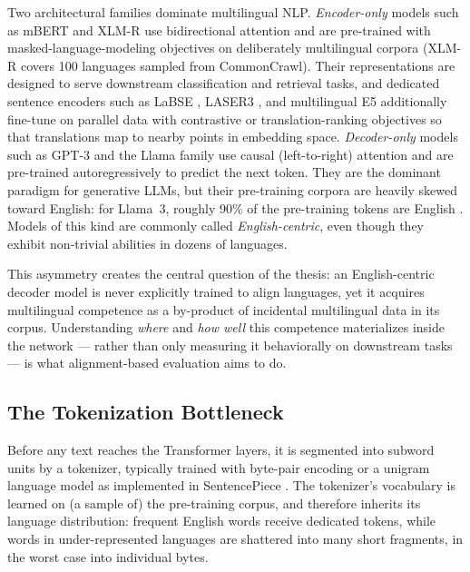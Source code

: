 Two architectural families dominate multilingual NLP. \emph{Encoder-only}
models such as mBERT \citep{devlin2019bert} and XLM-R
\citep{conneau2020xlmr} use bidirectional attention and are pre-trained
with masked-language-modeling objectives on deliberately multilingual
corpora (XLM-R covers 100 languages sampled from CommonCrawl). Their
representations are designed to serve downstream classification and
retrieval tasks, and dedicated sentence encoders such as LaBSE
\citep{feng2022labse}, LASER3 \citep{heffernan2022laser3}, and multilingual
E5 \citep{wang2024multilingual} additionally fine-tune on parallel data
with contrastive or translation-ranking objectives so that translations map
to nearby points in embedding space. \emph{Decoder-only} models such as
GPT-3 \citep{brown2020gpt3} and the Llama family \citep{dubey2024llama3}
use causal (left-to-right) attention and are pre-trained autoregressively
to predict the next token. They are the dominant paradigm for generative
LLMs, but their pre-training corpora are heavily skewed toward English:
for Llama~3, roughly 90\% of the pre-training tokens are English
\citep{dubey2024llama3}. Models of this kind are commonly called
\emph{English-centric}, even though they exhibit non-trivial abilities in
dozens of languages.

This asymmetry creates the central question of the thesis: an
English-centric decoder model is never explicitly trained to align
languages, yet it acquires multilingual competence as a by-product of
incidental multilingual data in its corpus. Understanding \emph{where} and
\emph{how well} this competence materializes inside the network --- rather
than only measuring it behaviorally on downstream tasks --- is what
alignment-based evaluation aims to do.

\subsection{The Tokenization Bottleneck}
\label{subsec:tokenization}

Before any text reaches the Transformer layers, it is segmented into
subword units by a tokenizer, typically trained with byte-pair encoding
\citep{sennrich2016bpe} or a unigram language model as implemented in
SentencePiece \citep{kudo2018sentencepiece}. The tokenizer's vocabulary is
learned on (a sample of) the pre-training corpus, and therefore inherits
its language distribution: frequent English words receive dedicated tokens,
while words in under-represented languages are shattered into many short
fragments, in the worst case into individual bytes.

